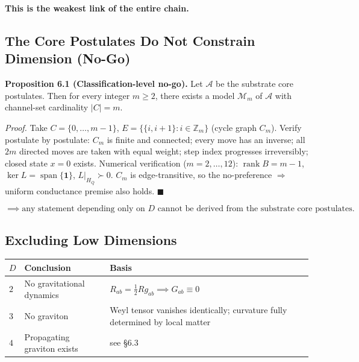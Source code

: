 \documentclass[
  11pt,
]{article}
\newcounter{none} %
\begin{document}
\textbf{This is the weakest link of the entire chain.}

\subsection{The Core Postulates Do Not Constrain Dimension
(No-Go)}\label{the-core-postulates-do-not-constrain-dimension-no-go}

\textbf{Proposition 6.1 (Classification-level no-go).} Let
\(\mathcal A\) be the substrate core postulates. Then for every integer
\(m\ge2\), there exists a model \(\mathcal M_m\) of \(\mathcal A\) with
channel-set cardinality \(|C|=m\).

\emph{Proof.} Take \(C=\{0,\dots,m-1\}\),
\(E=\{\{i,i+1\}:i\in\mathbb Z_m\}\) (cycle graph \(C_m\)). Verify
postulate by postulate: \(C_m\) is finite and connected; every move has
an inverse; all \(2m\) directed moves are taken with equal weight; step
index progresses irreversibly; closed state \(x=0\) exists. Numerical
verification (\(m=2,\dots,12\)): \(\operatorname{rank}B=m-1\),
\(\ker L=\operatorname{span}\{\mathbf1\}\), \(L|_{H_Q}\succ0\). \(C_m\)
is edge-transitive, so the no-preference \(\Rightarrow\) uniform
conductance premise also holds. \(\blacksquare\)

\[
\implies \text{any statement depending only on }D\text{ cannot be derived from the substrate core postulates}.
\tag{6.1}
\]

\subsection{Excluding Low
Dimensions}\label{excluding-low-dimensions}

{\def\LTcaptype{none} %
\begin{longtable}[]{@{}
  >{\centering\arraybackslash}p{}
  >{\raggedright\arraybackslash}p{}
  >{\raggedright\arraybackslash}p{}@{}}
\toprule\noalign{}
\begin{minipage}[b]{\linewidth}\centering
\(D\)
\end{minipage} & \begin{minipage}[b]{\linewidth}\raggedright
Conclusion
\end{minipage} & \begin{minipage}[b]{\linewidth}\raggedright
Basis
\end{minipage} \\
\midrule\noalign{}
\endhead
\bottomrule\noalign{}
\endlastfoot
\(2\) & No gravitational dynamics &
\(R_{ab}=\tfrac12Rg_{ab}\implies G_{ab}\equiv0\) \\
\(3\) & No graviton & Weyl tensor vanishes identically; curvature fully
determined by local matter \\
\(4\) & Propagating graviton exists & see §6.3 \\
\end{longtable}
}
\end{document}
